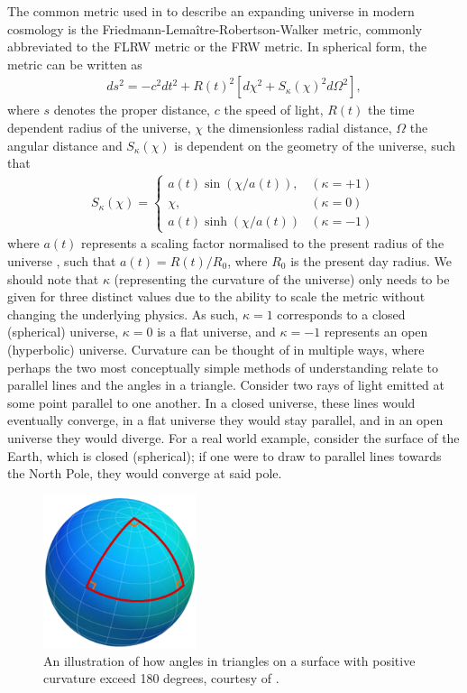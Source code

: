 \documentclass[titlesmallcaps, examinerscopy, copyrightpage]{uqthesis}
\begin{document}
The common metric used in to describe an expanding universe in modern cosmology is the Friedmann-Lema\^itre-Robertson-Walker metric, commonly abbreviated to the FLRW metric or the FRW metric. In spherical form, the metric can be written as
\begin{align}
ds^2 = -c^2 dt^2 + R(t)^2 \left[ d\chi^2 + S_\kappa(\chi)^2 d\Omega^2 \right], 
\end{align}
where $s$ denotes the proper distance, $c$ the speed of light, $R(t)$ the time dependent radius of the universe, $\chi$ the dimensionless radial distance, $\Omega$ the angular distance and $S_\kappa(\chi)$ is dependent on the geometry of the universe, such that
\begin{align}
S_\kappa(\chi) = \begin{cases}
    a(t) \sin(\chi/a(t)), & (\kappa = +1)\\
    \chi, & (\kappa = 0) \\
    a(t) \sinh (\chi/a(t)) & (\kappa = -1)
  \end{cases}
\end{align}
where $a(t)$ represents a scaling factor normalised to the present radius of the universe \citep{RydenPartridge2004}, such that $a(t) = R(t)/R_0$, where $R_0$ is the present day radius. We should note that $\kappa$ (representing the curvature of the universe) only needs to be given for three distinct values due to the ability to scale the metric without changing the underlying physics. As such, $\kappa = 1$ corresponds to a closed (spherical) universe, $\kappa = 0$ is a flat universe, and $\kappa = -1$ represents an open (hyperbolic) universe. Curvature can be thought of in multiple ways, where perhaps the two most conceptually simple methods of understanding relate to parallel lines and the angles in a triangle. Consider two rays of light emitted at some point parallel to one another. In a closed universe, these lines would eventually converge, in a flat universe they would stay parallel, and in an open universe they would diverge. For a real world example, consider the surface of the Earth, which is closed (spherical); if one were to draw to parallel lines towards the North Pole, they would converge at said pole. 
\begin{figure}
  \begin{center}
    \includegraphics[width=0.4\textwidth]{images/SphereRightAngle.png}
  \end{center}
  \caption{An illustration of how angles in triangles on a surface with positive curvature exceed 180 degrees, courtesy of \citet{LegnerMathigones}.}
  \label{fig:triangle}
\end{figure}
\end{document}
